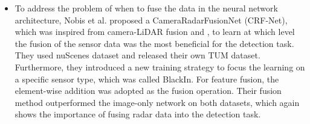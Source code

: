 \documentclass[rnd]{mas_proposal}
\begin{document}
\begin{itemize}


    \item To address the problem of when to fuse the data in the neural network architecture, Nobis et al. \cite{nobis2019deep} proposed a CameraRadarFusionNet (CRF-Net), which was inspired from camera-LiDAR fusion \cite{yu2019multi} and \cite{caltagirone2019lidar}, to learn at which level the fusion of the sensor data was the most beneficial for the detection task. They used nuScenes \cite{caesar2020nuscenes} dataset and released their own TUM dataset. Furthermore, they introduced a new training strategy to focus the learning on a specific sensor type, which was called BlackIn. For feature fusion, the element-wise addition was adopted as the fusion operation. Their fusion method outperformed the image-only network on both datasets, which again shows the importance of fusing radar data into the detection task.




\end{itemize}
\end{document}

